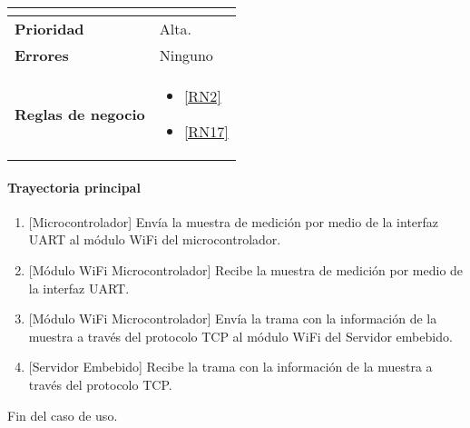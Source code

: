 \begin{longtable}{|J{5cm}|J{10.3cm}|}
\begin{itemize}
		\end{itemize} 
		\\ \hline 
	\textbf{Prioridad} & 
		Alta. \\ \hline
	\textbf{Errores} &
		 Ninguno 
		 \\ \hline
	\textbf{Reglas de negocio} & 
	    \begin{itemize}
	      \item  \ref{RN2}
	      \item  \ref{RN17}
		 \end{itemize}%
		 \hline
\end{longtable}

\paragraph{Trayectoria principal}
\label{SUB-M-CU1.4:TP}
	\begin{enumerate}
	    \item {[Microcontrolador]} Envía la muestra de medición por medio de la interfaz UART al módulo WiFi del microcontrolador.
	    \item {[Módulo WiFi Microcontrolador]} Recibe la muestra de medición por medio de la interfaz UART.
	    \item {[Módulo WiFi Microcontrolador]} Envía la trama con la información de la muestra a través del protocolo TCP al módulo WiFi del Servidor embebido.
	    \item {[Servidor Embebido]} Recibe la trama con la información de la muestra a través del protocolo TCP.
	\end{enumerate}
	Fin del caso de uso.
